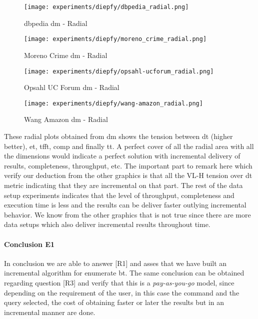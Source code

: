 \begin{figure}[!htb]
  \centering
  \begin{minipage}{0.5\textwidth}
   \texttt{[image: experiments/diepfy/dbpedia\_radial.png]}
    \caption{\acrshort{dbpedia} \acrshort{dm} - Radial}
    \label{fig:dief:dbpedia-radial}
  \end{minipage}%
  \begin{minipage}{0.5\textwidth}
   \texttt{[image: experiments/diepfy/moreno\_crime\_radial.png]}
    \caption{Moreno Crime \acrshort{dm} - Radial}
    \label{fig:dief:moreno-radial}
  \end{minipage}
\end{figure}
%
\begin{figure}[!htb]
  \centering
  \begin{minipage}{0.5\textwidth}
   \texttt{[image: experiments/diepfy/opsahl-ucforum\_radial.png]}
    \caption{Opsahl UC Forum \acrshort{dm} - Radial}
    \label{fig:dief:opsahl-radial}
  \end{minipage}%
  \begin{minipage}{0.5\textwidth}
    \texttt{[image: experiments/diepfy/wang-amazon\_radial.png]}
     \caption{Wang Amazon \acrshort{dm} - Radial}
     \label{fig:dief:wang-radial}
   \end{minipage}
 \end{figure}

These radial plots obtained from \acrshort{dm} shows the tension between \acrfull{dt} (higher better),
\acrfull{et}, \acrfull{tfft}, \acrfull{comp} and finally \acrfull{tt}. A perfect cover of all the radial area with all the dimensions would
indicate a perfect solution with incremental delivery of results, completeness, throughput, etc. The important part to remark here which verify
our deduction from the other graphics is that all the VL-H tension over \acrshort{dt} metric indicating that they are incremental on that part. 
The rest of the data setup experiments indicates that the level of throughput, completeness and execution time is less and the results can be deliver
faster outlying incremental behavior. We know from the other graphics that is not true since there are more data setups which also deliver incremental 
results throughout time.

\paragraph{Conclusion E1} In conclusion we are able to answer [R1] and asses that we have built an incremental algorithm for enumerate \acrlong{bt}. 
The same conclusion can be obtained regarding question [R3] and verify that this is a \emph{pay-as-you-go} model, since depending on the requirement of the user, 
in this case the command and the query selected, the cost of obtaining faster or later the results but in an incremental manner are done.

